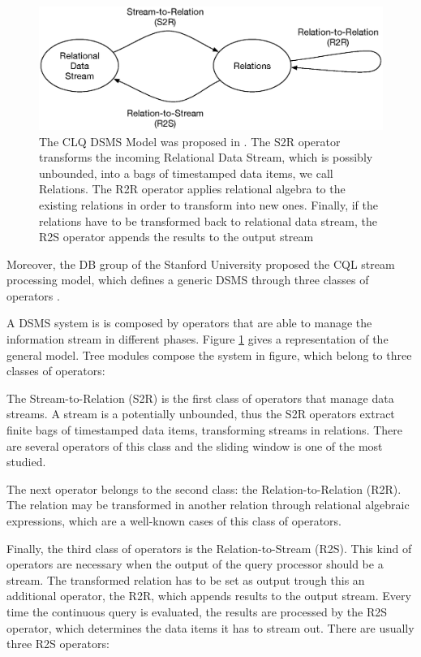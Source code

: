 \begin{figure}[tbh]
  \centering
	\includegraphics[width=\linewidth]{images/cql-model}
	\caption[CLQ DSMS Model]{The CLQ DSMS Model was proposed in \cite{Arasu2006}. The S2R operator transforms the incoming Relational Data Stream, which is possibly unbounded, into a bags of timestamped data items, we call Relations. The R2R operator applies relational algebra to the existing relations in order to transform into new ones. Finally, if the relations have to be transformed back to relational data stream, the R2S operator appends the results to the output stream} 
  	\label{fig:cql}
\end{figure}

Moreover, the DB group of the Stanford University proposed the CQL stream processing model, which defines a generic DSMS through three classes of operators \cite{Arasu2006}.

A DSMS system is is composed by operators that are able to manage the information stream in different phases. Figure \ref{fig:cql} gives a representation of the general model. Tree modules compose the system in figure, which belong to three classes of operators:  

The Stream-to-Relation (S2R) is the first class of operators that manage data streams.  A stream is a potentially unbounded, thus the S2R operators extract finite bags of timestamped data items, transforming streams in relations. There are several operators of this class and the sliding window is one of the most studied. 

The next operator belongs to the second class: the Relation-to-Relation (R2R). The relation may be transformed in another relation through relational algebraic expressions, which are a well-known cases of this class of operators. 

Finally, the third class of operators is the Relation-to-Stream (R2S). This kind of operators are necessary when the output of the query processor should be a stream. The transformed relation has to be set as output trough this an additional operator, the R2R, which appends results to the output stream. Every time the continuous query is evaluated, the results are processed by the R2S operator, which determines the data items it has to stream out. There are usually three R2S operators:

